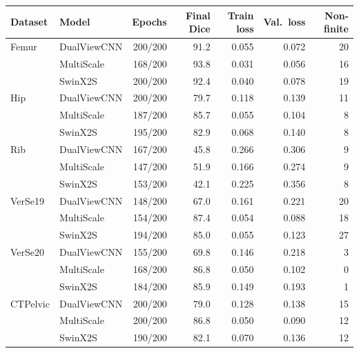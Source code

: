\begin{tabular}{llrrrrr}
\toprule
Dataset & Model & Epochs & Final Dice & Train loss & Val.\ loss & Non-finite \\
\midrule
Femur & DualViewCNN & 200/200 & 91.2 & 0.055 & 0.072 & 20 \\
 & MultiScale & 168/200 & 93.8 & 0.031 & 0.056 & 16 \\
 & SwinX2S & 200/200 & 92.4 & 0.040 & 0.078 & 19 \\
Hip & DualViewCNN & 200/200 & 79.7 & 0.118 & 0.139 & 11 \\
 & MultiScale & 187/200 & 85.7 & 0.055 & 0.104 & 8 \\
 & SwinX2S & 195/200 & 82.9 & 0.068 & 0.140 & 8 \\
Rib & DualViewCNN & 167/200 & 45.8 & 0.266 & 0.306 & 9 \\
 & MultiScale & 147/200 & 51.9 & 0.166 & 0.274 & 9 \\
 & SwinX2S & 153/200 & 42.1 & 0.225 & 0.356 & 8 \\
VerSe19 & DualViewCNN & 148/200 & 67.0 & 0.161 & 0.221 & 20 \\
 & MultiScale & 154/200 & 87.4 & 0.054 & 0.088 & 18 \\
 & SwinX2S & 194/200 & 85.0 & 0.055 & 0.123 & 27 \\
VerSe20 & DualViewCNN & 155/200 & 69.8 & 0.146 & 0.218 & 3 \\
 & MultiScale & 168/200 & 86.8 & 0.050 & 0.102 & 0 \\
 & SwinX2S & 184/200 & 85.9 & 0.149 & 0.193 & 1 \\
CTPelvic & DualViewCNN & 200/200 & 79.0 & 0.128 & 0.138 & 15 \\
 & MultiScale & 200/200 & 86.8 & 0.050 & 0.090 & 12 \\
 & SwinX2S & 190/200 & 82.1 & 0.070 & 0.136 & 12 \\
\bottomrule
\end{tabular}
